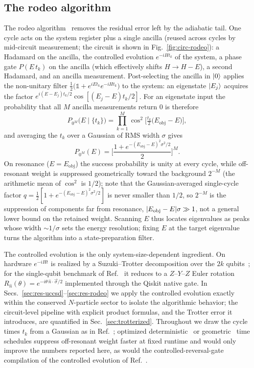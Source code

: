 \documentclass[
  aps,            %
  prc,            %
  reprint,        %
  superscriptaddress,
  floatfix,
  nofootinbib
]{revtex4-2}
\newcommand{\Eobj}{E_{\mathrm{obj}}}
\begin{document}
\subsection{The rodeo algorithm}
\label{sec:rodeo}
The rodeo algorithm~\cite{Choi2021,Qian2024} removes the residual error left by the
adiabatic tail.  One cycle acts on the system register plus a single ancilla
(reused across cycles by mid-circuit measurement; the circuit is shown in
Fig.~\ref{fig:circ-rodeo}): a Hadamard on the ancilla, the
controlled evolution $e^{-iH t_k}$ of the system, a phase gate $P(E\,t_k)$ on the
ancilla (which effectively shifts $H\to H-E$), a second Hadamard, and an ancilla
measurement.  Post-selecting the ancilla in $\ket{0}$ applies the non-unitary filter
$\tfrac12\big(\mathbb{1}+e^{iE t_k}e^{-iH t_k}\big)$ to the system: an eigenstate
$\ket{E_j}$ acquires the factor $e^{i(E-E_j)t_k/2}\cos[(E_j-E)t_k/2]$.  For an
eigenstate input the probability that all $M$ ancilla measurements return $0$ is
therefore~\cite{Qian2024}
\begin{equation}
  P_{0^{M}}\!\big(E\mid\{t_k\}\big)=\prod_{k=1}^{M}
  \cos^2\!\Big[\tfrac{t_k}{2}\big(\Eobj-E\big)\Big],
  \label{eq:rodeo1}
\end{equation}
and averaging the $t_k$ over a Gaussian of RMS width $\sigma$ gives
\begin{equation}
  P_{0^{M}}(E)=\Bigg[\frac{1+e^{-(\Eobj-E)^2\sigma^2/2}}{2}\Bigg]^{M}.
  \label{eq:rodeo2}
\end{equation}
On resonance ($E=\Eobj$) the success probability is unity at every cycle, while
off-resonant weight is suppressed geometrically toward the background $2^{-M}$ (the
arithmetic mean of $\cos^2$ is $1/2$); note that the Gaussian-averaged
single-cycle factor $q=\tfrac12[1+e^{-(\Eobj-E)^2\sigma^2/2}]$ is never
smaller than $1/2$, so $2^{-M}$ is the suppression of components far from
resonance, $\abs{\Eobj-E}\sigma\gg1$, not a general lower bound on the
retained weight.  Scanning $E$ thus locates eigenvalues as
peaks whose width $\sim 1/\sigma$ sets the energy resolution; fixing $E$ at the
target eigenvalue turns the algorithm into a state-preparation filter.

The controlled evolution is the only system-size-dependent ingredient.  On hardware
$e^{-iH t}$ is realized by a Suzuki--Trotter decomposition over the $2k$
qubits~\cite{Trotter1959,Suzuki1976,Childs2021}; for the single-qubit benchmark of
Ref.~\cite{Qian2024} it reduces to a $Z$--$Y$--$Z$ Euler rotation
$R_{\hat n}(\theta)=e^{-i\theta\,\hat n\cdot\vec\sigma/2}$ implemented through the
Qiskit native gate.  In Secs.~\ref{sec:res-uccsd}--\ref{sec:res-rodeo} we apply the
controlled evolution exactly within the conserved $N$-particle sector to isolate the
algorithmic behavior; the circuit-level pipeline with explicit product formulas,
and the Trotter error it introduces, are quantified in Sec.~\ref{sec:trotterized}.
Throughout we draw the cycle times $t_k$ from a Gaussian as in
Ref.~\cite{Choi2021}; optimized deterministic~\cite{Cohen2023} or
geometric~\cite{Patkowski2026} time schedules suppress off-resonant weight faster
at fixed runtime and would only improve the numbers reported here, as would the
controlled-reversal-gate compilation of the controlled evolution of
Ref.~\cite{BeeLindgren2022}.
\end{document}
